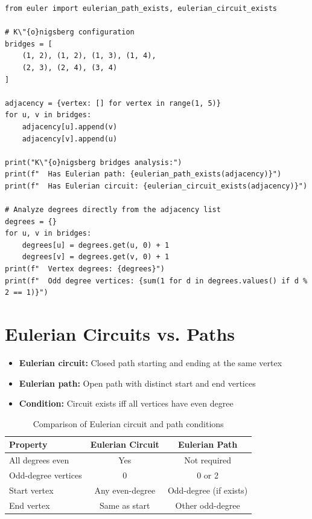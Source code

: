 \begin{lstlisting}[caption={Checking Eulerian path existence}, label=lst:konigsberg]
from euler import eulerian_path_exists, eulerian_circuit_exists

# K\"{o}nigsberg configuration
bridges = [
    (1, 2), (1, 2), (1, 3), (1, 4),
    (2, 3), (2, 4), (3, 4)
]

adjacency = {vertex: [] for vertex in range(1, 5)}
for u, v in bridges:
    adjacency[u].append(v)
    adjacency[v].append(u)

print("K\"{o}nigsberg bridges analysis:")
print(f"  Has Eulerian path: {eulerian_path_exists(adjacency)}")
print(f"  Has Eulerian circuit: {eulerian_circuit_exists(adjacency)}")

# Analyze degrees directly from the adjacency list
degrees = {}
for u, v in bridges:
    degrees[u] = degrees.get(u, 0) + 1
    degrees[v] = degrees.get(v, 0) + 1
print(f"  Vertex degrees: {degrees}")
print(f"  Odd degree vertices: {sum(1 for d in degrees.values() if d % 2 == 1)}")
\end{lstlisting}

\section{Eulerian Circuits vs. Paths}

\begin{itemize}
\item \textbf{Eulerian circuit:} Closed path starting and ending at the same vertex
\item \textbf{Eulerian path:} Open path with distinct start and end vertices
\item \textbf{Condition:} Circuit exists iff all vertices have even degree
\end{itemize}

\begin{table}[H]
\centering
\begin{tabular}{l|c|c}
Property & Eulerian Circuit & Eulerian Path \\
\hline
All degrees even & Yes & Not required \\
Odd-degree vertices & 0 & 0 or 2 \\
Start vertex & Any even-degree & Odd-degree (if exists) \\
End vertex & Same as start & Other odd-degree \\
\end{tabular}
\caption{Comparison of Eulerian circuit and path conditions}
\label{tab:eulerian_comparison}
\end{table}

